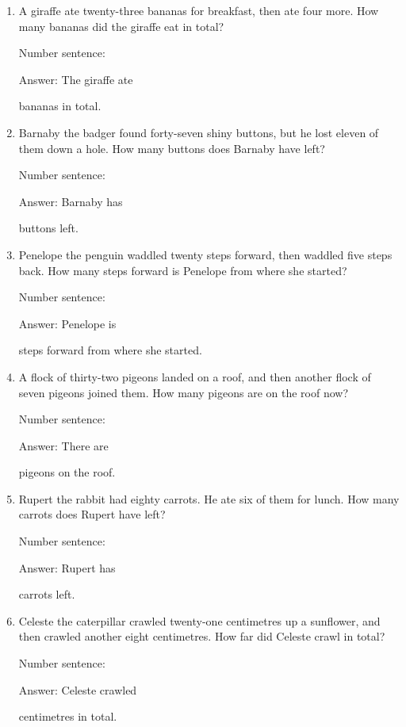 \documentclass{tufte-book}
\begin{document}
\begin{enumerate}

\item
  A giraffe ate twenty-three bananas for breakfast, then ate four more.
  How many bananas did the giraffe eat in total?\medskip\par
  Number sentence:
  \dotfill\medskip\par
  Answer: The giraffe ate
  \dotfill\medskip\par\mbox{}\dotfill\medskip\par\mbox{}\dotfill\bigskip
  bananas in total.
\item
  Barnaby the badger found forty-seven shiny buttons, but he lost eleven
  of them down a hole. How many buttons does Barnaby have left?\medskip\par
  Number sentence:
  \dotfill\medskip\par
  Answer: Barnaby has
  \dotfill\medskip\par\mbox{}\dotfill\medskip\par\mbox{}\dotfill\bigskip
  buttons left.
\item
  Penelope the penguin waddled twenty steps forward, then waddled five
  steps back. How many steps forward is Penelope from where she
  started?\medskip\par
  Number sentence:
  \dotfill\medskip\par
  Answer: Penelope is
  \dotfill\medskip\par\mbox{}\dotfill\medskip\par\mbox{}\dotfill\bigskip
  steps forward from where she started.
\item
  A flock of thirty-two pigeons landed on a roof, and then another flock
  of seven pigeons joined them. How many pigeons are on the roof now?\medskip\par
  Number sentence:
  \dotfill\medskip\par
  Answer: There are
  \dotfill\medskip\par\mbox{}\dotfill\medskip\par\mbox{}\dotfill\bigskip
  pigeons on the roof.
\item
  Rupert the rabbit had eighty carrots. He ate six of them for lunch.
  How many carrots does Rupert have left?\medskip\par
  Number sentence:
  \dotfill\medskip\par
  Answer: Rupert has
  \dotfill\medskip\par\mbox{}\dotfill\medskip\par\mbox{}\dotfill\bigskip
  carrots left.
\item
  Celeste the caterpillar crawled twenty-one centimetres up a sunflower,
  and then crawled another eight centimetres. How far did Celeste crawl
  in total?\medskip\par
  Number sentence:
  \dotfill\medskip\par
  Answer: Celeste crawled
  \dotfill\medskip\par\mbox{}\dotfill\medskip\par\mbox{}\dotfill\bigskip
  centimetres in total.
\end{enumerate}
\end{document}
